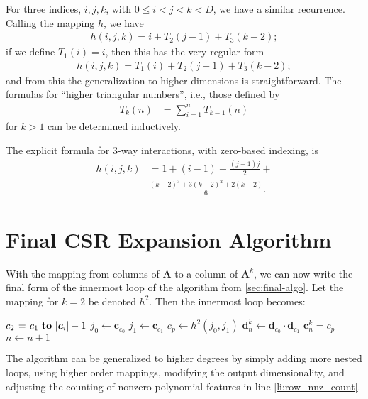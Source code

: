 \documentclass{article}
\begin{document}
For three indices, $i,j,k$, with $0 \le i < j < k < D$, we have a similar recurrence. Calling the mapping $h$, we have 
\begin{align}
h(i,j,k) = i + T_2(j-1) + T_3(k-2);
\end{align}
if we define $T_1(i) = i$, then this has the very regular form
\begin{align}
h(i,j,k) =  T_1(i) + T_2(j-1) + T_3(k-2);
\end{align}
and from this the generalization to higher dimensions is straightforward. The formulas for ``higher triangular numbers'', i.e., those defined by
\begin{align}
T_k(n) &= \sum_{i=1}^n T_{k-1}(n)
\end{align}
for $k > 1$ can be determined inductively.

The explicit formula for 3-way interactions, with zero-based indexing, is 
\begin{align}
h(i, j, k) &= 1 + (i-1) + \frac{(j-1)j}{2} + \\
& \frac{(k-2)^3 + 3(k-2)^2 + 2(k-2)}{6}. 
\end{align}

\section{Final CSR Expansion Algorithm}
With the mapping from columns of $\bm{A}$ to a column of $\bm{A}^k$, we can now write the final form of the innermost loop of the algorithm from \ref{sec:final-algo}.
Let the mapping for $k=2$ be denoted $h^2$.
Then the innermost loop becomes:

\begin{codebox}
\footnotesize
    \zi         \For $c_2 \gets c_1 \To |\bm{c}_i|-1$ \Do
    \zi             $j_0 \gets \bm{c}_{c_0}$
    \zi             $j_1 \gets \bm{c}_{c_1}$
    \zi             $c_p \gets h^2(j_0, j_1)$
    \zi             $\bm{d}^k_{n} \gets \bm{d}_{c_0} \cdot \bm{d}_{c_1}$
    \zi             $\bm{c}^k_{n} = c_p$
    \zi             $n \gets n + 1$
                \End
\end{codebox}

The algorithm can be generalized to higher degrees by simply adding more nested loops, using higher order mappings, modifying the output dimensionality, and adjusting the counting of nonzero polynomial features in line \ref{li:row_nnz_count}.
\end{document}
